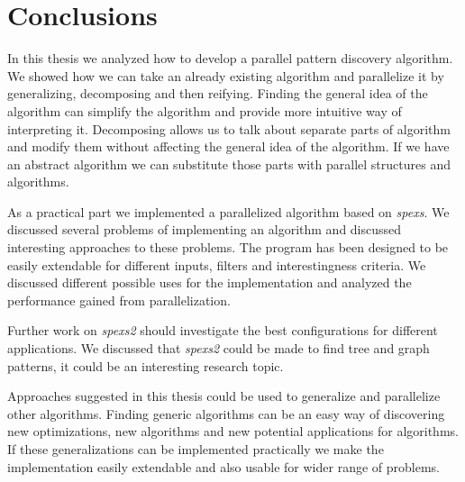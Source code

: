 \chapter{Conclusions}
\label{c:conclusions}

In this thesis we analyzed how to develop a parallel pattern discovery algorithm. We showed how we can take an already existing algorithm and parallelize it by generalizing, decomposing and then reifying. Finding the general idea of the algorithm can simplify the algorithm and provide more intuitive way of interpreting it. Decomposing allows us to talk about separate parts of algorithm and modify them without affecting the general idea of the algorithm. If we have an abstract algorithm we can substitute those parts with parallel structures and algorithms.

As a practical part we implemented a parallelized algorithm based on \emph{spexs}\cite{spexs}. We discussed several problems of implementing an algorithm and discussed interesting approaches to these problems. The program has been designed to be easily extendable for different inputs, filters and interestingness criteria. We discussed different possible uses for the implementation and analyzed the performance gained from parallelization.

Further work on \emph{spexs2} should investigate the best configurations for different applications. We discussed that \emph{spexs2} could be made to find tree and graph patterns, it could be an interesting research topic.

Approaches suggested in this thesis could be used to generalize and parallelize other algorithms. Finding generic algorithms can be an easy way of discovering new optimizations, new algorithms and new potential applications for algorithms. If these generalizations can be implemented practically we make the implementation easily extendable and also usable for wider range of problems.